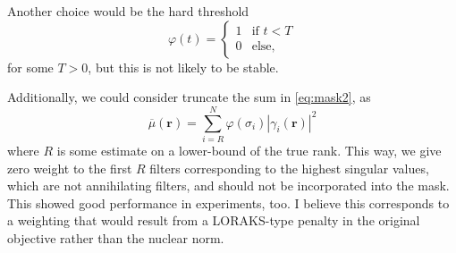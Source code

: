 \documentclass[a4paper]{article}
\begin{document}
Another choice would be the hard threshold
\[
\varphi(t) = \begin{cases}1 & \text{if } t < T\\ 0 & \text{else},\end{cases}
\]
for some $T > 0$, but this is not likely to be stable.

Additionally, we could consider truncate the sum in \eqref{eq:mask2}, as
\begin{equation}
\label{eq:mask3}
\overline{\mu}(\mathbf r) = \sum_{i=R}^N \varphi(\sigma_i) |\gamma_i(\mathbf r)|^2
\end{equation}
where $R$ is some estimate on a lower-bound of the true rank. This way, we give zero weight to the first $R$ filters corresponding to the highest singular values, which are not annihilating filters, and should not be incorporated into the mask. This showed good performance in experiments, too. I believe this corresponds to a weighting that would result from a LORAKS-type penalty in the original objective rather than the nuclear norm. 
\end{document}
